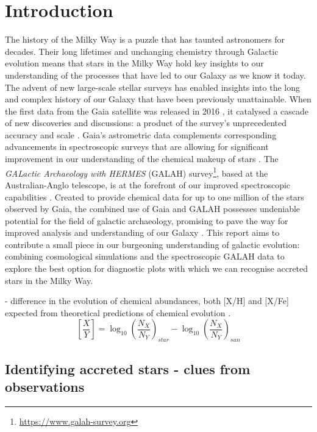 \documentclass[fleqn,usenatbib]{mnras}
\begin{document}


\section{Introduction}
\label{sec:intro}

The history of the Milky Way is a puzzle that has taunted astronomers for decades. Their long lifetimes and unchanging chemistry through Galactic evolution means that stars in the Milky Way hold key insights to our understanding of the processes that have led to our Galaxy as we know it today. The advent of new large-scale stellar surveys has enabled insights into the long and complex history of our Galaxy that have been previously unattainable. When the first data from the Gaia satellite was released in 2016 \citep{Brown2016}, it catalysed a cascade of new discoveries and discussions: a product of the survey's unprecedented accuracy and scale \citep{BlandHawthorn2019}. Gaia’s astrometric data complements corresponding advancements in spectroscopic surveys that are allowing for significant improvement in our understanding of the chemical makeup of stars \citep{Buck2021}. The \textit{GALactic Archaeology with HERMES} (GALAH) survey\footnote{\url{https://www.galah-survey.org}}, based at the Australian-Anglo telescope, is at the forefront of our improved spectroscopic capabilities \citep{DeSilva2015}. Created to provide chemical data for up to one million of the stars observed by Gaia, the combined use of Gaia and GALAH possesses undeniable potential for the field of galactic archaeology, promising to pave the way for improved analysis and understanding of our Galaxy \citep{Buder2021}. This report aims to contribute a small piece in our burgeoning understanding of galactic evolution: combining cosmological simulations and the spectroscopic GALAH data to explore the best option for diagnostic plots with which we can recognise accreted stars in the Milky Way.  

- difference in the evolution of chemical abundances, both [X/H] and [X/Fe] expected from theoretical predictions of chemical evolution \citep[see e.g.][]{Kobayashi2020}.
\begin{equation}
\left[\frac{X}{Y}\right]=\log_{10}\left(\frac{N_X}{N_Y}\right)_{star} -\log_{10}\left(\frac{N_X}{N_Y}\right)_{sun}
\end{equation}

\subsection{Identifying accreted stars - clues from observations}
\end{document}
